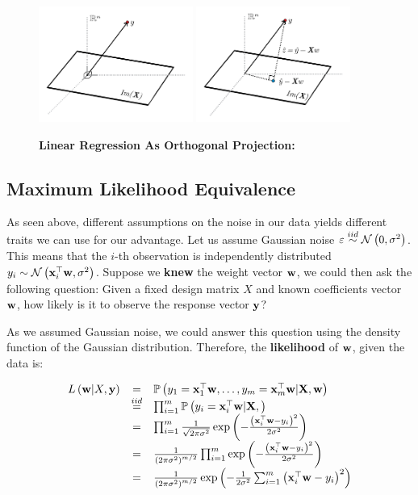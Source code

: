 \begin{figure}[!h]
	\centering
	\includegraphics[width=0.45\textwidth]{chapters/intro.regression/figures/2_4.png}
	\hfill
	\includegraphics[width=0.45\textwidth]{chapters/intro.regression/figures/2_5.png}
	\caption{\textbf{Linear Regression As Orthogonal Projection:} }
	\label{fig:regression_geometric}
\end{figure}


\subsection{Maximum Likelihood Equivalence}
As seen above, different assumptions on the noise in our data yields different traits we can use for our advantage. Let us assume Gaussian noise $\varepsilon\overset{iid}{\sim}\mathcal{N}\left(0,\sigma^2\right)$. This means that the $i$-th observation is independently distributed $y_i\sim\mathcal{N}\left(\mathbf{x}_i^\top\mathbf{w},\sigma^2\right)$. Suppose we \textbf{knew} the weight vector $\mathbf{w}$, we could then ask the following question: Given a fixed design matrix $X$ and known coefficients vector $\mathbf{w}$, how likely is it to observe the response vector $\mathbf{y}$?

As we assumed Gaussian noise, we could answer this question using the density function of the Gaussian distribution. %
Therefore, the \textbf{likelihood} of $\mathbf{w}$, given the data is:

$$
\begin{array}{ccl}
L\left(\mathbf{w}|X,\mathbf{y}\right) & = & \mathbb{P}\left(y_{1}=\mathbf{x}_{1}^{\top}\mathbf{w},\ldots,y_{m}=\mathbf{x}_{m}^{\top}\mathbf{w}|\mathbf{X},\mathbf{w}\right) \\
& \overset{iid}{=} & \prod_{i=1}^{m}\mathbb{P}\left(y_{i}=\mathbf{x}_{i}^{\top}\mathbf{w}|\mathbf{X},\right) \\
& = & \prod_{i=1}^{m}\frac{1}{\sqrt{2\pi\sigma^{2}}}\exp\left(-\frac{\left(\mathbf{x}_{i}^{\top}\mathbf{w}-y_{i}\right)^{2}}{2\sigma^{2}}\right) \\
& = & \frac{1}{\left(2\pi\sigma^{2}\right)^{m/2}}\prod_{i=1}^{m}\exp\left(-\frac{\left(\mathbf{x}_{i}^{\top}\mathbf{w}-y_{i}\right)^{2}}{2\sigma^{2}}\right)\\
& = & \frac{1}{\left(2\pi\sigma^{2}\right)^{m/2}}\exp\left(-\frac{1}{2\sigma^{2}}\sum_{i=1}^{m}\left(\mathbf{x}_{i}^{\top}\mathbf{w}-y_{i}\right)^{2}\right)
\end{array}
$$


